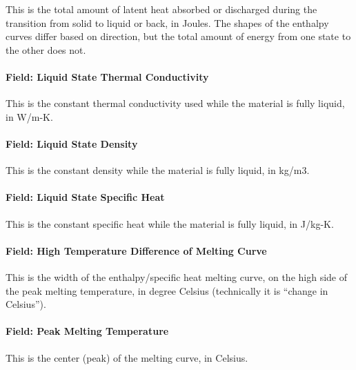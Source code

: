 This is the total amount of latent heat absorbed or discharged during the transition from solid to liquid or back, in Joules. The shapes of the enthalpy curves differ based on direction, but the total amount of energy from one state to the other does not.

\paragraph{Field: Liquid State Thermal Conductivity}\label{materialpropertyphasechangehysteresis-inputs-liquidk}

This is the constant thermal conductivity used while the material is fully liquid, in W/m-K.

\paragraph{Field: Liquid State Density}\label{materialpropertyphasechangehysteresis-inputs-liquidrho}

This is the constant density while the material is fully liquid, in kg/m3.

\paragraph{Field: Liquid State Specific Heat}\label{materialpropertyphasechangehysteresis-inputs-liquid-state-specific-heat}

This is the constant specific heat while the material is fully liquid, in J/kg-K.

\paragraph{Field: High Temperature Difference of Melting Curve}\label{materialpropertyphasechangehysteresis-inputs-high-temperature-difference-of-melting-curve}

This is the width of the enthalpy/specific heat melting curve, on the high side of the peak melting temperature, in degree Celsius (technically it is ``change in Celsius'').

\paragraph{Field: Peak Melting Temperature}\label{materialpropertyphasechangehysteresis-inputs-peak-melting-temperature}

This is the center (peak) of the melting curve, in Celsius.

